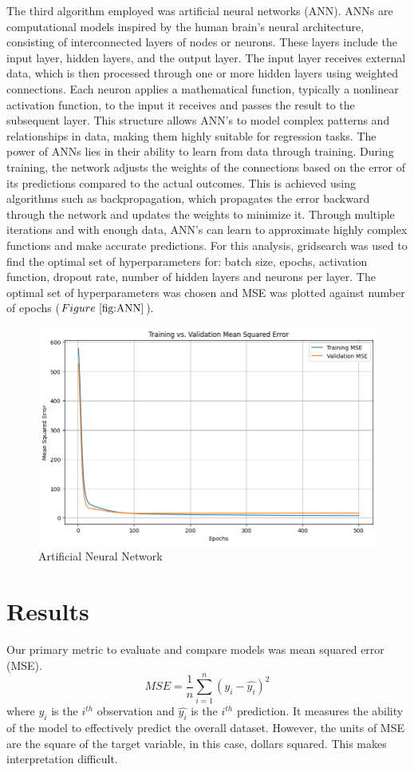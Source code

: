\documentclass[conference, 11pt]{IEEEtran}
\begin{document}
The third algorithm employed was artificial neural networks (ANN). ANNs are computational models inspired by the human brain's neural architecture, consisting of interconnected layers of nodes or neurons. These layers include the input layer, hidden layers, and the output layer. The input layer receives external data, which is then processed through one or more hidden layers using weighted connections. Each neuron applies a mathematical function, typically a nonlinear activation function, to the input it receives and passes the result to the subsequent layer. This structure allows ANN’s to model complex patterns and relationships in data, making them highly suitable for regression tasks.
The power of ANNs lies in their ability to learn from data through training. During training, the network adjusts the weights of the connections based on the error of its predictions compared to the actual outcomes. This is achieved using algorithms such as backpropagation, which propagates the error backward through the network and updates the weights to minimize it. Through multiple iterations and with enough data, ANN’s can learn to approximate highly complex functions and make accurate predictions. For this analysis, gridsearch was used to find the optimal set of hyperparameters for: batch size, epochs, activation function, dropout rate, number of hidden layers and neurons per layer. The optimal set of hyperparameters was chosen and MSE was plotted against number of epochs ($Figure~\ref{fig:ANN}$).

\begin{figure}[h!]
    \centering
    \includegraphics[width=1\linewidth]{ANN.png}
    \caption{Artificial Neural Network}
    \label{fig:ANN}
\end{figure}
\section{Results}
Our primary metric to evaluate and compare models was mean squared error (MSE).
\[
MSE = \frac{1}{n}\sum_{i=1}^n(y_i - \hat{y_i})^2
\]
where $y_i$ is the $i^{th}$ observation and $\hat{y_i}$ is the $i^{th}$ prediction. It measures the ability of the model to effectively predict the overall dataset. However, the units of MSE are the square of the target variable, in this case, dollars squared. This makes interpretation difficult.
\end{document}
